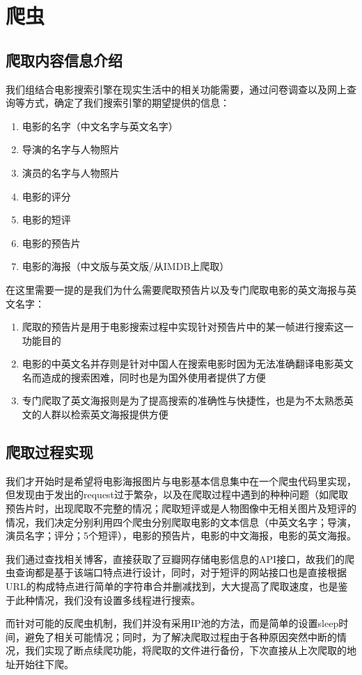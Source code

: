 \documentclass[main.tex]{subfiles}
\begin{document}
\section{爬虫}
\subsection{爬取内容信息介绍}

我们组结合电影搜索引擎在现实生活中的相关功能需要，通过问卷调查以及网上查询等方式，确定了我们搜索引擎的期望提供的信息：
\begin{enumerate}
	\item 电影的名字（中文名字与英文名字）
	\item 导演的名字与人物照片
	\item 演员的名字与人物照片
	\item 电影的评分
	\item 电影的短评
	\item 电影的预告片
	\item 电影的海报（中文版与英文版/从IMDB上爬取）
\end{enumerate}
在这里需要一提的是我们为什么需要爬取预告片以及专门爬取电影的英文海报与英文名字：
\begin{enumerate}
	\item 爬取的预告片是用于电影搜索过程中实现针对预告片中的某一帧进行搜索这一功能目的
	\item 电影的中英文名并存则是针对中国人在搜索电影时因为无法准确翻译电影英文名而造成的搜索困难，同时也是为国外使用者提供了方便
	\item 专门爬取了英文海报则是为了提高搜索的准确性与快捷性，也是为不太熟悉英文的人群以检索英文海报提供方便
\end{enumerate}
\subsection{爬取过程实现}
我们才开始时是希望将电影海报图片与电影基本信息集中在一个爬虫代码里实现，但发现由于发出的request过于繁杂，以及在爬取过程中遇到的种种问题（如爬取预告片时，出现爬取不完整的情况；爬取短评或是人物图像中无相关图片及短评的情况，我们决定分别利用四个爬虫分别爬取电影的文本信息（中英文名字；导演，演员名字；评分；5个短评），电影的预告片，电影的中文海报，电影的英文海报。\par
我们通过查找相关博客，直接获取了豆瓣网存储电影信息的API接口，故我们的爬虫查询都是基于该端口特点进行设计，同时，对于短评的网站接口也是直接根据URL的构成特点进行简单的字符串合并删减找到，大大提高了爬取速度，也是鉴于此种情况，我们没有设置多线程进行搜索。\par
而针对可能的反爬虫机制，我们并没有采用IP池的方法，而是简单的设置sleep时间，避免了相关可能情况；同时，为了解决爬取过程由于各种原因突然中断的情况，我们实现了断点续爬功能，将爬取的文件进行备份，下次直接从上次爬取的地址开始往下爬。
\end{document}
